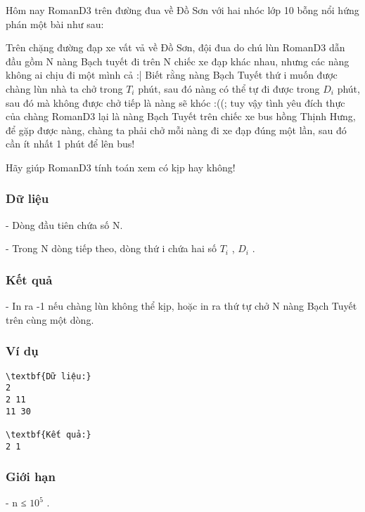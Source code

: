 







   Hôm nay RomanD3 trên đường đua về Đồ Sơn với hai nhóc lớp 10 bỗng nổi hứng phán một bài như sau:  

   Trên chặng đường đạp xe vất vả về Đồ Sơn, đội đua do chú lùn RomanD3 dẫn đầu gồm N nàng Bạch tuyết đi trên N chiếc xe đạp khác nhau, nhưng các nàng không ai chịu đi một mình cả :| Biết rằng nàng Bạch Tuyết thứ i muốn được chàng lùn nhà ta chở trong $T_{i}$   phút, sau đó nàng có thể tự đi được trong $D_{i}$   phút, sau đó mà không được chở tiếp là nàng sẽ khóc :((; tuy vậy tình yêu đích thực của chàng RomanD3 lại là nàng Bạch Tuyết trên chiếc xe bus hồng Thịnh Hưng, để gặp được nàng, chàng ta phải chở mỗi nàng đi xe đạp đúng một lần, sau đó cần ít nhất 1 phút để lên bus!  

   Hãy giúp RomanD3 tính toán xem có kịp hay không!  

\subsubsection{   Dữ liệu  }

   - Dòng đầu tiên chứa số N.   


   - Trong N dòng tiếp theo, dòng thứ i chứa hai số $T_{i}$   , $D_{i}$   .  

\subsubsection{   Kết quả  }

   - In ra -1 nếu chàng lùn không thể kịp, hoặc in ra thứ tự chở N nàng Bạch Tuyết trên cùng một dòng.  

\subsubsection{   Ví dụ  }
\begin{verbatim}
\textbf{Dữ liệu:}
2
2 11
11 30

\textbf{Kết quả:}
2 1
\end{verbatim}

\subsubsection{   Giới hạn  }

   - n ≤ $10^{5}$   .  

